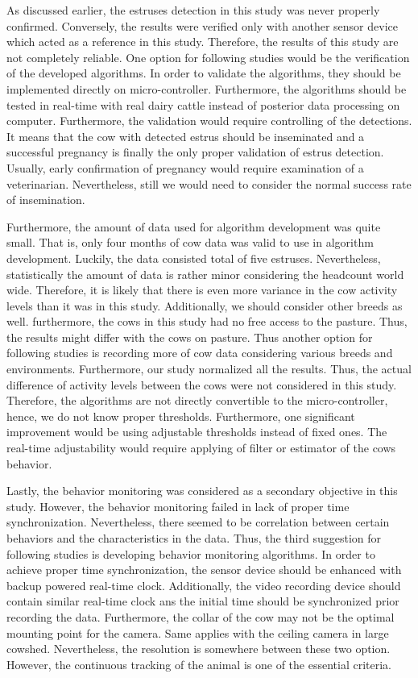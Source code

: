 \documentclass[english,12pt,a4paper,pdftex,elec,utf8]{aaltothesis}
\begin{document}
As discussed earlier, the estruses detection in this study was never properly confirmed. Conversely, the results were verified only with another sensor device which acted as a reference in this study. Therefore, the results of this study are not completely reliable. One option for following studies would be the verification of the developed algorithms. In order to validate the algorithms, they should be implemented directly on micro-controller. Furthermore, the algorithms should be tested in real-time with real dairy cattle instead of posterior data processing on computer. Furthermore, the validation would require controlling of the detections. It means that the cow with detected estrus should be inseminated and a successful pregnancy is finally the only proper validation of estrus detection. Usually, early confirmation of pregnancy would require examination of a veterinarian. Nevertheless, still we would need to consider the normal success rate of insemination.

Furthermore, the amount of data used for algorithm development was quite small. That is, only four months of cow data was valid to use in algorithm development. Luckily, the data consisted total of five estruses. Nevertheless, statistically the amount of data is rather minor considering the headcount world wide. Therefore, it is likely that there is even more variance in the cow activity levels than it was in this study. Additionally, we should consider other breeds as well. furthermore, the cows in this study had no free access to the pasture. Thus, the results might differ with the cows on pasture. Thus another option for following studies is recording more of cow data considering various breeds and environments. Furthermore, our study normalized all the results. Thus, the actual difference of activity levels between the cows were not considered in this study. Therefore, the algorithms are not directly convertible to the micro-controller, hence, we do not know proper thresholds. Furthermore, one significant improvement would be using adjustable thresholds instead of fixed ones. The real-time adjustability would require applying of filter or estimator of the cows behavior.

Lastly, the behavior monitoring was considered as a secondary objective in this study. However, the behavior monitoring failed in lack of proper time synchronization. Nevertheless, there seemed to be correlation between certain behaviors and the characteristics in the data. Thus, the third suggestion for following studies is developing behavior monitoring algorithms. In order to achieve proper time synchronization, the sensor device should be enhanced with backup powered real-time clock. Additionally, the video recording device should contain similar real-time clock ans the initial time should be synchronized prior recording the data. Furthermore, the collar of the cow may not be the optimal mounting point for the camera. Same applies with the ceiling camera in large cowshed. Nevertheless, the resolution is somewhere between these two option. However, the continuous tracking of the animal is one of the essential criteria.
\end{document}
